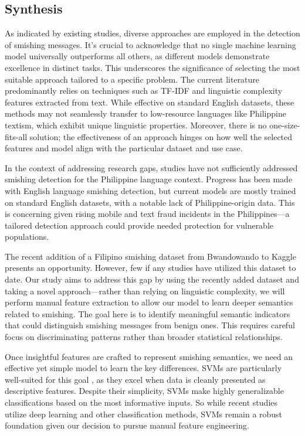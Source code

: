 \documentclass[conference]{IEEEtran}
\begin{document}
\subsection*{Synthesis}

As indicated by existing studies, diverse approaches are employed in the detection of smishing messages. It's crucial to acknowledge that no single machine learning model universally outperforms all others, as different models demonstrate excellence in distinct tasks. This underscores the significance of selecting the most suitable approach tailored to a specific problem. The current literature predominantly relies on techniques such as TF-IDF and linguistic complexity features extracted from text. While effective on standard English datasets, these methods may not seamlessly transfer to low-resource languages like Philippine textism, which exhibit unique linguistic properties. Moreover, there is no one-size-fits-all solution; the effectiveness of an approach hinges on how well the selected features and model align with the particular dataset and use case.

In the context of addressing research gaps, studies have not sufficiently addressed smishing detection for the Philippine language context. Progress has been made with English language smishing detection, but current models are mostly trained on standard English datasets, with a notable lack of Philippine-origin data. This is concerning given rising mobile and text fraud incidents in the Philippines—a tailored detection approach could provide needed protection for vulnerable populations.

The recent addition of a Filipino smishing dataset from Bwandowando \cite{bwandowando2023} to Kaggle presents an opportunity. However, few if any studies have utilized this dataset to date. Our study aims to address this gap by using the recently added dataset and taking a novel approach—rather than relying on linguistic complexity, we will perform manual feature extraction to allow our model to learn deeper semantics related to smishing. The goal here is to identify meaningful semantic indicators that could distinguish smishing messages from benign ones. This requires careful focus on discriminating patterns rather than broader statistical relationships.

Once insightful features are crafted to represent smishing semantics, we need an effective yet simple model to learn the key differences. SVMs are particularly well-suited for this goal \cite{noah2022}\cite{torabi2015}, as they excel when data is cleanly presented as descriptive features. Despite their simplicity, SVMs make highly generalizable classifications based on the most informative inputs. So while recent studies utilize deep learning and other classification methods, SVMs remain a robust foundation given our decision to pursue manual feature engineering.
\end{document}
